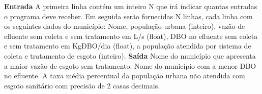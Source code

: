 \documentclass[a4paper, 12pt]{article}
\begin{document}
\newline \newline
\textbf{{\large Entrada}} \newline
A primeira linha contém um inteiro N que irá indicar quantas entradas o programa deve receber.
\newline
Em seguida serão fornecidas N linhas, cada linha com os seguintes dados do município: Nome, população urbana (inteiro), vazão de efluente sem coleta e sem tratamento em L/s (float), DBO no efluente sem coleta e sem tratamento em KgDBO/dia (float), a população atendida por sistema de coleta e tratamento de esgoto (inteiro).
\newline \newline
\textbf{{\large Saída}} \newline
Nome do município que apresenta a maior vazão de esgoto sem tratamento.
\newline
Nome do município com a menor DBO no efluente.
\newline
A taxa média percentual da população urbana não atendida com esgoto sanitário com precisão de 2 casas decimais.
\end{document}
